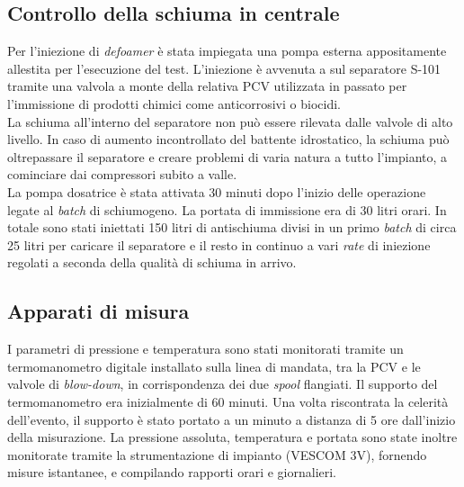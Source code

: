 \subsection{Controllo della schiuma in centrale}
Per l'iniezione di \textit{defoamer} è stata impiegata una pompa esterna appositamente allestita per l'esecuzione del test. L'iniezione è avvenuta a sul separatore S-101 tramite una valvola a monte della relativa PCV utilizzata in passato per l'immissione di prodotti chimici come anticorrosivi o biocidi.\\
La schiuma all'interno del separatore non può essere rilevata dalle valvole di alto livello. In caso di aumento incontrollato del battente idrostatico, la schiuma può oltrepassare il separatore e creare problemi di varia natura a tutto l'impianto, a cominciare dai compressori subito a valle.\\
La pompa dosatrice è stata attivata 30 minuti dopo l'inizio delle operazione legate al \textit{batch} di schiumogeno. La portata di immissione era di 30 litri orari. In totale sono stati iniettati 150 litri di antischiuma divisi in un primo \textit{batch} di circa 25 litri per caricare il separatore e il resto in continuo a vari \textit{rate} di iniezione regolati a seconda della qualità di schiuma in arrivo. 

\subsection{Apparati di misura}
I parametri di pressione e temperatura sono stati monitorati tramite un termomanometro digitale installato sulla linea di mandata, tra la PCV e le valvole di \textit{blow-down}, in corrispondenza dei due \textit{spool} flangiati. Il supporto del termomanometro era inizialmente di 60 minuti. Una volta riscontrata la celerità dell'evento, il supporto è stato portato a un minuto a distanza di 5 ore dall'inizio della misurazione. La pressione assoluta, temperatura e portata sono state inoltre monitorate tramite la strumentazione di impianto (VESCOM 3V), fornendo misure istantanee, e compilando rapporti orari e giornalieri.

